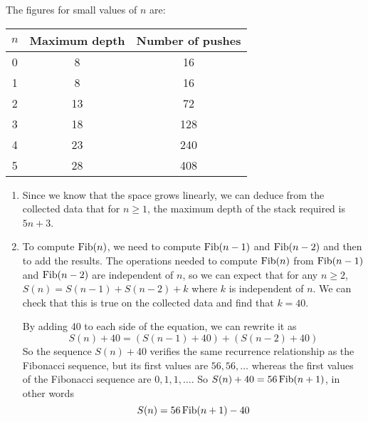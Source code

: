 \begin{exe}[5.29]
    The figures for small values of $n$ are:
    \begin{center}
	\begin{tabular}{|c|c|c|}
	    \hline
	    \textbf{$n$} & \textbf{Maximum depth} & \textbf{Number of pushes} 
	    \\\hline
	    0 & 8 & 16 \\\hline
	    1 & 8 & 16 \\\hline
	    2 & 13 & 72 \\\hline
	    3 & 18 & 128 \\\hline
	    4 & 23 & 240 \\\hline
	    5 & 28 & 408 \\\hline
	\end{tabular}
    \end{center}
    \begin{enumerate}
	\item Since we know that the space grows linearly, we can deduce from 
	    the collected data that for $n \geq 1$, the maximum depth of the 
	    stack required is $5n + 3$.
	\item To compute $\operatorname{Fib}(n)$, we need to compute $\operatorname{Fib}(n - 1)$
	    and $\operatorname{Fib}(n - 2)$ and then to add the results. The operations needed 
	    to compute $\operatorname{Fib}(n)$ from $\operatorname{Fib}(n - 1)$ and $\operatorname{Fib}(n - 2)$ are 
	    independent of $n$, so we can expect that for any $n \geq 2$,
	    $S(n) = S(n - 1) + S(n - 2) + k$ where $k$ is independent of $n$. We 
	    can check that this is true on the collected data and find that $k 
	    = 40$.

	    By adding 40 to each side of the equation, we can rewrite it as
	    \[ S(n) + 40 = \left(S(n - 1) + 40\right)
			   + \left(S(n - 2) + 40\right) \]
	    So the sequence $S(n) + 40$ verifies the same recurrence 
	    relationship as the Fibonacci sequence, but its first values are 
	    $56, 56,…$ whereas the first values of the Fibonacci sequence are 
	    $0, 1, 1,…$. So $S(n) + 40 = 56 \operatorname{Fib}(n + 1)$, in other words
	    \[ S(n) = 56 \operatorname{Fib}(n + 1) - 40 \]
    \end{enumerate}
\end{exe}


